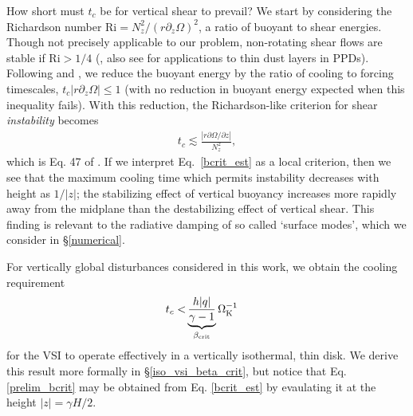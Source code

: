 \documentclass[iop, numberedappendix]{emulateapj}
\newcommand{\p}{\partial}
\def \OmK {\Omega_{\rm K}}
\begin{document}
How short must $t_c$ be for vertical shear to prevail?  We start by 
considering the Richardson number $\mathrm{Ri} = N_z^2/(r\p_z\Omega)^2$, a 
ratio of buoyant to shear energies.  Though not precisely applicable to our problem,
non-rotating shear flows are stable if $\mathrm{Ri} > 1/4$ (\citealp{chandrasekhar61}, 
also see \citealp{ys02, lee10} for applications to thin dust layers in PPDs).
Following \cite{urpin03} and \cite{townsend58},  we reduce the buoyant energy by the 
ratio of cooling to forcing timescales, $t_c |r \p_z\Omega| \leq 1$ (with no reduction in buoyant energy 
expected when this inequality fails).  With this reduction, the Richardson-like criterion for 
shear \emph{instability} becomes
\begin{align}\label{bcrit_est}
  t_c \lesssim \frac{\left|r\p\Omega/\p z\right|} {N_z^2}, 
\end{align}
which is Eq.  47 of \cite{urpin03}. %
If we interpret Eq.\ \ref{bcrit_est} as a local criterion, then we see that 
the maximum cooling time which permits instability decreases with height as $1/|z|$;  
the stabilizing effect of vertical buoyancy increases more rapidly away from
the midplane than the destabilizing effect of vertical shear.  
This finding is relevant to the radiative damping of so called `surface 
modes', which we consider in \S\ref{numerical}.

For vertically global disturbances considered in this work, 
we obtain the cooling requirement 
\begin{align}\label{prelim_bcrit}
  t_c <  &\underbrace{\frac{h |q| }{\gamma - 1}}_{\beta_\mathrm{crit}}\OmK^{-1}
\end{align}   
for the VSI to operate effectively in a vertically isothermal, thin
disk. We derive this result more formally in
\S\ref{iso_vsi_beta_crit}, but notice that Eq. \ref{prelim_bcrit}
may be obtained from Eq. \ref{bcrit_est} by evaulating it at the
height $|z|=\gamma H/2$. %

\end{document}

